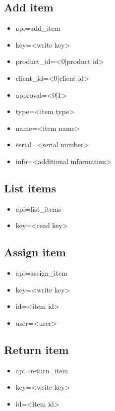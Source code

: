 \documentclass[11pt]{article}
\begin{document}
\subsection{Add item}

\begin{itemize}
\item api=add\_item
\item key=<write key>
\item product\_id=<0|product id>
\item client\_id=<0|client id>
\item approval=<0|1>
\item type=<item type>
\item name=<item name>
\item serial=<serial number>
\item info=<additional information>
\end{itemize}

\subsection{List items}

\begin{itemize}
\item api=list\_items
\item key=<read key>
\end{itemize}

\subsection{Assign item}

\begin{itemize}
\item api=assign\_item
\item key=<write key>
\item id=<item id>
\item user=<user>
\end{itemize}

\subsection{Return item}

\begin{itemize}
\item api=return\_item
\item key=<write key>
\item id=<item id>
\end{itemize}
\end{document}

